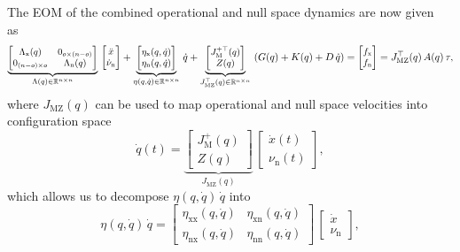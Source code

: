 The \gls{EOM} of the combined operational and null space dynamics are now given as~\citep{ott2008cartesian}
\begin{equation}\small
    \underbrace{\begin{bmatrix}
        \Lambda_\mathrm{x}(q) & 0_{o \times (n-o)}\\
        0_{(n-o) \times o} & \Lambda_\mathrm{n}(q)
    \end{bmatrix}}_{\Lambda(q) \in \mathbb{R}^{n \times n}} \, \begin{bmatrix}
        \ddot{x}\\
        \dot{\nu}_\mathrm{n}
    \end{bmatrix} + \underbrace{\begin{bmatrix}
        \eta_\mathrm{x}(q, \dot{q})\\
        \eta_\mathrm{n}(q, \dot{q})
    \end{bmatrix}}_{\eta(q,\dot{q}) \in \mathbb{R}^{n \times n} } \, \dot{q} + \underbrace{\begin{bmatrix}
        J_\mathrm{M}^{+\top}(q)\\
        Z(q)
    \end{bmatrix}}_{J_\mathrm{MZ}^\top(q) \in \mathbb{R}^{n \times n}} \, \left ( G(q) + K(q) + D \, \dot{q} \right ) = \begin{bmatrix}
        f_\mathrm{x}\\ f_\mathrm{n}
    \end{bmatrix} = J_\mathrm{MZ}^\top(q) \, A(q) \, \tau,
\end{equation}
where $J_\mathrm{MZ}(q)$ can be used to map operational and null space velocities into configuration space~\citep{ott2008cartesian}
\begin{equation}
    \dot{q}(t) = \underbrace{\begin{bmatrix}
        J_\mathrm{M}^{+}(q)\\
        Z(q)
    \end{bmatrix}}_{J_\mathrm{MZ}(q)} \, \begin{bmatrix}
        \dot{x}(t)\\ \nu_\mathrm{n}(t)
    \end{bmatrix},
\end{equation}
which allows us to decompose $\eta(q,\dot{q}) \, \dot{q}$ into
\begin{equation}
    \eta(q,\dot{q}) \, \dot{q} = \begin{bmatrix}
        \eta_\mathrm{xx}(q,\dot{q}) & \eta_\mathrm{xn}(q,\dot{q})\\
        \eta_\mathrm{nx}(q,\dot{q}) & \eta_\mathrm{nn}(q,\dot{q})
    \end{bmatrix} \, \begin{bmatrix}
        \dot{x}\\ \nu_\mathrm{n}
    \end{bmatrix},
\end{equation}

